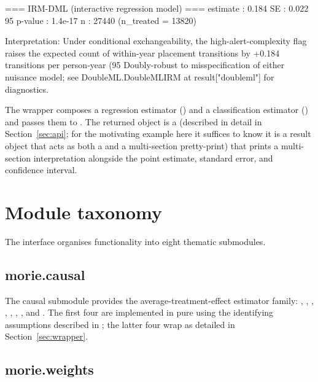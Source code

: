 \documentclass[article,shortnames,nojss]{jss}
\begin{document}
\begin{Code}
=== IRM-DML (interactive regression model) ===
  estimate : 0.184
  SE       : 0.022
  95%
  p-value  : 1.4e-17
  n        : 27440  (n_treated = 13820)

Interpretation:
  Under conditional exchangeability, the high-alert-complexity flag
  raises the expected count of within-year placement transitions
  by +0.184 transitions per person-year (95%
  Doubly-robust to misspecification of either nuisance model;
  see DoubleML.DoubleMLIRM at result["doubleml"] for diagnostics.
\end{Code}

\noindent The  wrapper composes a
 regression estimator
() and a classification estimator
() and passes them to
. The returned object is a
 (described in detail in Section~\ref{sec:api}; for the
motivating example here it suffices to know it is a result object
that acts as both a  and a multi-section pretty-print) that prints a
multi-section interpretation alongside the point estimate,
standard error, and confidence interval.

\section{Module taxonomy}
\label{sec:taxonomy}

The   interface organises
functionality into eight thematic submodules.

\subsection{morie.causal}

The causal submodule provides the average-treatment-effect
estimator family:
, ,
, ,
, ,
, and . The first four
are implemented in pure  using the identifying
assumptions described in \citet{Ruhela2026MRM}; the latter four
wrap  as detailed in Section~\ref{sec:wrapper}.

\subsection{morie.weights}
\end{document}
